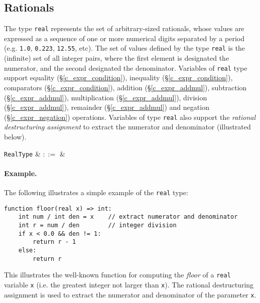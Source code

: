 \subsection{Rationals}
\label{c_types_real}

The type \lstinline{real} represents the set of arbitrary-sized rationals, whose values are expressed as a sequence of one or more numerical digits separated by a period (e.g. \lstinline{1.0}, \lstinline{0.223}, \lstinline{12.55}, etc).  The set of values defined by the type \lstinline{real} is the (infinite) set of all integer pairs, where the first element is designated the numerator, and the second designated the denominator.  Variables of \lstinline{real} type support equality (\S\ref{c_expr_condition}), inequality (\S\ref{c_expr_condition}), comparators (\S\ref{c_expr_condition}), addition (\S\ref{c_expr_addmul}), subtraction (\S\ref{c_expr_addmul}), multiplication (\S\ref{c_expr_addmul}), division (\S\ref{c_expr_addmul}), remainder (\S\ref{c_expr_addmul}) and negation (\S\ref{c_expr_negation}) operations.  Variables of type \lstinline{real} also support the {\em rational destructuring assignment} to extract the numerator and denominator (illustrated below).

\begin{syntax}
  \verb+RealType+ & $::=$ &  \\
\end{syntax}

\paragraph{Example.} The following illustrates a simple example of the \lstinline{real} type:

\begin{lstlisting}
function floor(real x) => int:
    int num / int den = x    // extract numerator and denominator
    int r = num / den        // integer division
    if x < 0.0 && den != 1: 	 
        return r - 1 
    else:
        return r 
\end{lstlisting}
This illustrates the well-known function for computing the {\em floor} of a \lstinline{real} variable \lstinline{x} (i.e. the greatest integer not larger than \lstinline{x}).  The rational destructuring assignment is used to extract the numerator and denominator of the parameter \lstinline{x}.


